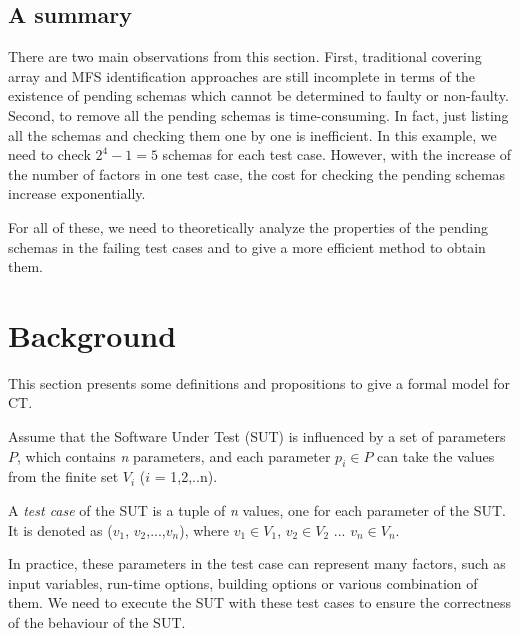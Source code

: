 \subsection{A summary}

There are two main observations from this section. First, traditional covering array and MFS identification approaches are still incomplete in terms of the existence of pending schemas which cannot be determined to faulty or non-faulty. Second, to remove all the pending schemas is time-consuming. In fact, just listing all the schemas and checking them one by one is inefficient. In this example, we need to check $2^{4} - 1 = 5$ schemas for each test case. However, with the increase of the number of factors in one test case, the cost for checking the pending schemas increase exponentially.

For all of these, we need to theoretically analyze the properties of the pending schemas in the failing test cases and to give a more efficient method to obtain them.

\section{Background}\label{sec:back}
This section presents some definitions and propositions to give a formal model for CT.

Assume that the Software Under Test (SUT) is influenced by a set of parameters $P$, which contains \emph{n} parameters, and each parameter $p_{i} \in P$ can take the values from the finite set $V_{i}$ ($i$ = 1,2,..n).

\newtheorem{assumption}{Assumption}

\begin{definition}\label{de:testcase}
A \emph{test case} of the SUT is a tuple of \emph{n} values, one for each parameter of the SUT. It is denoted as  ($v_{1}$, $v_{2}$,...,$v_{n}$), where $v_{1}\in V_{1}$, $v_{2} \in V_{2}$ ... $v_{n} \in V_{n}$.
\end{definition}

In practice, these parameters in the test case can represent many factors, such as input variables, run-time options, building options or various combination of them. We need to execute the SUT with these test cases to ensure the correctness of the behaviour of the SUT.

